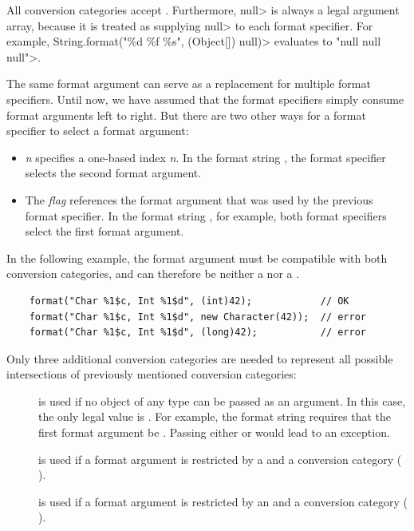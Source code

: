\noindent All conversion categories accept .
Furthermore, \<null> is always a legal argument array, because it is treated
as supplying \<null> to each format specifier.  For example,
\<String.format("\%d \%f \%s", (Object[]) null)> evaluates to \<"null null null">.

The same format argument can serve as a replacement for multiple format specifiers.
Until now, we have assumed that the format specifiers simply consume format arguments left to right.
But there are two other ways for a format specifier to select a format argument:

\begin{itemize}
\item \textit{n}\code{\$} specifies a one-based index \textit{n}. In the
    format string , the format specifier selects the
    second format argument.
\item The \code{<} \emph{flag} references the format argument
    that was used by the previous format specifier. In the format string
    , for example, both format specifiers select the first
    format argument.
\end{itemize}

\noindent
In the following example,
the format argument must be compatible with both conversion
categories, and can therefore be neither a  nor a .

\begin{Verbatim}
    format("Char %1$c, Int %1$d", (int)42);            // OK
    format("Char %1$c, Int %1$d", new Character(42));  // error
    format("Char %1$c, Int %1$d", (long)42);           // error
\end{Verbatim}

Only three additional conversion categories are needed to represent all possible
intersections of previously mentioned conversion categories:

\begin{description}
\item[] is used if no object of any type can be
    passed as an argument. In this case, the only legal value is .
    For example, the format string  requires that the first
    format argument be .  Passing either  or
     would lead to an exception.
\item[] is used if a format argument is restricted by a  and a  conversion category ( \capsym{} ).
\item[] is used if a format argument is restricted by an  and a  conversion category ( \capsym{} ).
\end{description}

